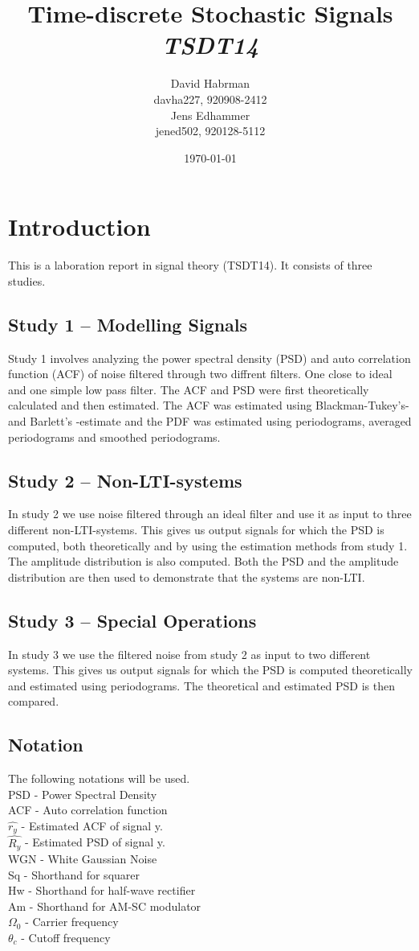 \documentclass[10pt]{article}
\title{Time-discrete Stochastic Signals\\
\emph{TSDT14}}
\author{David Habrman \\ davha227, 920908-2412\\
Jens Edhammer \\ jened502, 920128-5112 }
\date{\today}
\begin{document}
\maketitle

\section{Introduction}
This is a laboration report in signal theory (TSDT14). It consists of three studies.

\subsection{Study 1 – Modelling Signals}
Study 1 involves analyzing the power spectral density (PSD) and auto correlation function (ACF)
of noise filtered through two diffrent filters. One close to ideal and one simple low pass filter.
The ACF and PSD were first theoretically calculated and then estimated.
The ACF was estimated using Blackman-Tukey's- and Barlett's -estimate and the
PDF was estimated using periodograms, averaged periodograms and smoothed periodograms.

\subsection{Study 2 – Non-LTI-systems}
In study 2 we use noise filtered through an ideal filter and use it as input to three different non-LTI-systems.
This gives us output signals for which the PSD is computed, both theoretically and by using the estimation methods
from study 1. The  amplitude distribution is also computed. Both the PSD and the  amplitude distribution are then used
to demonstrate that the systems are non-LTI.

\subsection{Study 3 – Special Operations}
In study 3 we use the filtered noise from study 2 as input to two different systems.
This gives us output signals for which the PSD is computed theoretically and estimated using
periodograms. The theoretical and estimated PSD is then compared.

\subsection{Notation}
The following notations will be used. \\
PSD - Power Spectral Density \\
ACF - Auto correlation function \\
$\hat{r_y}$ - Estimated ACF of signal y. \\
$\hat{R_y}$ - Estimated PSD of signal y. \\
WGN - White Gaussian Noise\\
Sq - Shorthand for squarer\\
Hw - Shorthand for half-wave rectifier\\
Am - Shorthand for AM-SC modulator\\
$\Omega_0$ - Carrier frequency\\
$\theta_c$ - Cutoff frequency
\end{document}
